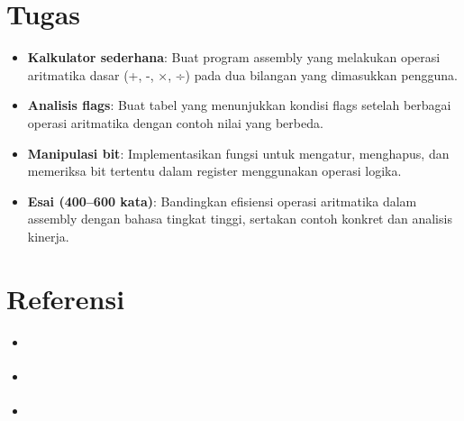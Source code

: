 \section{Tugas}\label{sec:instruksi-dasar-tugas}
\begin{itemize}
    \item \textbf{Kalkulator sederhana}: Buat program assembly yang melakukan operasi aritmatika dasar (+, -, ×, ÷) pada dua bilangan yang dimasukkan pengguna.
    \item \textbf{Analisis flags}: Buat tabel yang menunjukkan kondisi flags setelah berbagai operasi aritmatika dengan contoh nilai yang berbeda.
    \item \textbf{Manipulasi bit}: Implementasikan fungsi untuk mengatur, menghapus, dan memeriksa bit tertentu dalam register menggunakan operasi logika.
    \item \textbf{Esai (400--600 kata)}: Bandingkan efisiensi operasi aritmatika dalam assembly dengan bahasa tingkat tinggi, sertakan contoh konkret dan analisis kinerja.
\end{itemize}

\section{Referensi}\label{sec:instruksi-dasar-referensi}
\begin{itemize}
    \item \cite{hyde2010art}
    \item \cite{nopi2003tutorial}
    \item \cite{intel2019manual32}
\end{itemize}
